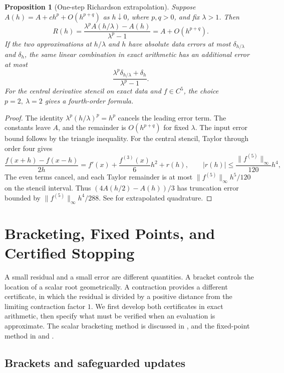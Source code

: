 \documentclass[11pt,oneside,openany]{book}
\theoremstyle{plain}
\newtheorem{proposition}[theorem]{Proposition}
\theoremstyle{definition}
\theoremstyle{remark}
\begin{document}
\pagebreak
\begin{proposition}[One-step Richardson extrapolation]\label{p206:W61}
Suppose \(A(h)=A+c h^p+O(h^{p+q})\) as \(h\downarrow0\),
where \(p,q>0\), and fix \(\lambda>1\). Then
\[
 R(h)=\frac{\lambda^p A(h/\lambda)-A(h)}{\lambda^p-1}
       = A+O(h^{p+q}).
\]
If the two approximations at \(h/\lambda\) and \(h\) have
absolute data errors at most \(\delta_{h/\lambda}\) and
\(\delta_h\), the same linear combination in exact arithmetic
has an additional error at most
\[
 \frac{\lambda^p\delta_{h/\lambda}+\delta_h}{\lambda^p-1}.
\]
For the central derivative stencil on exact data and \(f\in C^5\),
the choice \(p=2,\ \lambda=2\) gives a fourth-order formula.
\end{proposition}

\begin{proof}
The identity \(\lambda^p(h/\lambda)^p=h^p\) cancels the leading
error term. The constants leave \(A\), and the remainder is
\(O(h^{p+q})\) for fixed \(\lambda\). The input error bound follows
by the triangle inequality. For the central stencil, Taylor
through order four gives
\[
 \frac{f(x+h)-f(x-h)}{2h}
       =f'(x)+\frac{f^{(3)}(x)}6 h^2+r(h),\qquad
 |r(h)|\le\frac{\lVert f^{(5)}\rVert_\infty}{120}h^4,
\]
The even terms cancel, and each Taylor remainder is at most
\(\lVert f^{(5)}\rVert_\infty h^5/120\) on the stencil interval.
Thus \((4A(h/2)-A(h))/3\) has truncation error bounded by
\(\lVert f^{(5)}\rVert_\infty h^4/288\).
See \cite[Section 3.4]{stoer} for extrapolated quadrature.
\end{proof}
\chapter[Brackets, Fixed Points, and Stopping]{Bracketing, Fixed Points, and Certified Stopping}

A small residual and a small error are different quantities. A bracket
controls the location of a scalar root geometrically. A contraction
provides a different certificate, in which the residual is divided by a
positive distance from the limiting contraction factor \(1\). We first
develop both certificates in exact arithmetic, then specify what must be
verified when an evaluation is approximate. The scalar bracketing method
is discussed in \cite[Section~2.1]{persson}, and the fixed-point method in
\cite[Section~5.2]{stoer} and \cite[Section~4.2]{driscoll}.

\section{Brackets and safeguarded updates}
\end{document}
